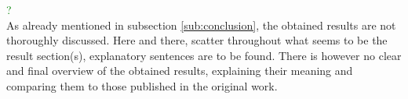 \documentclass[../review.tex]{subfiles}
\begin{document}
 \textcolor{green}{\Large\checkmark ?}\\
As already mentioned in subsection \ref{sub:conclusion}, the obtained results are not thoroughly discussed. Here and there, scatter throughout what seems to be the result section(s), explanatory sentences are to be found. There is however no clear and final overview of the obtained results, explaining their meaning and comparing them to those published in the original work.
\end{document}
